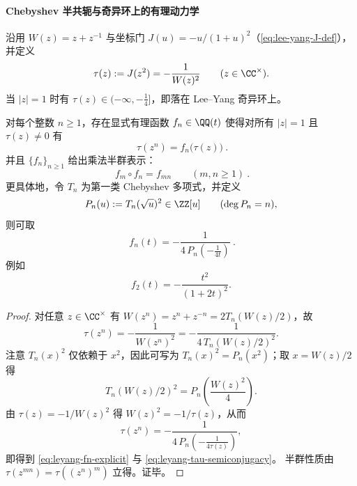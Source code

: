 \paragraph{Chebyshev 半共轭与奇异环上的有理动力学}
沿用 \(W(z)=z+z^{-1}\) 与坐标门 \(J(u)=-u/(1+u)^2\)（\eqref{eq:lee-yang-J-def}），并定义
\begin{equation}\label{eq:leyang-tau-def}
\tau(z):=J(z^2)=-\frac{1}{W(z)^2}\qquad(z\in\CC^{\times}).
\end{equation}
当 \(|z|=1\) 时有 \(\tau(z)\in(-\infty,-\tfrac14]\)，即落在 Lee--Yang 奇异环上。

\begin{theorem}\label{thm:leyang-chebyshev-semiconjugacy}
对每个整数 \(n\ge 1\)，存在显式有理函数 \(f_n\in\QQ(t)\) 使得对所有 \(|z|=1\) 且 \(\tau(z)\neq 0\) 有
\begin{equation}\label{eq:leyang-tau-semiconjugacy}
\boxed{\ \tau(z^n)=f_n\bigl(\tau(z)\bigr)\ }.
\end{equation}
并且 \(\{f_n\}_{n\ge 1}\) 给出乘法半群表示：
\begin{equation}\label{eq:leyang-tau-semigroup}
\boxed{\ f_m\circ f_n=f_{mn}\qquad(m,n\ge 1)\ }.
\end{equation}
更具体地，令 \(T_n\) 为第一类 Chebyshev 多项式，并定义
\[
P_n(u):=T_n(\sqrt{u})^2\in\ZZ[u]\qquad(\deg P_n=n),
\]
则可取
\begin{equation}\label{eq:leyang-fn-explicit}
\boxed{\ f_n(t)=-\frac{1}{4\,P_n\!\left(-\frac{1}{4t}\right)}\ }.
\end{equation}
例如
\[
f_2(t)=-\frac{t^2}{(1+2t)^2}.
\]
\end{theorem}

\begin{proof}
对任意 \(z\in\CC^{\times}\) 有
\(
W(z^n)=z^n+z^{-n}=2T_n(W(z)/2)
\)，故
\[
\tau(z^n)=-\frac{1}{W(z^n)^2}
=-\frac{1}{4\,T_n(W(z)/2)^2}.
\]
注意 \(T_n(x)^2\) 仅依赖于 \(x^2\)，因此可写为 \(T_n(x)^2=P_n(x^2)\)；取 \(x=W(z)/2\) 得
\[
T_n(W(z)/2)^2=P_n\!\left(\frac{W(z)^2}{4}\right).
\]
由 \(\tau(z)=-1/W(z)^2\) 得 \(W(z)^2=-1/\tau(z)\)，从而
\[
\tau(z^n)
=-\frac{1}{4\,P_n\!\left(-\frac{1}{4\tau(z)}\right)},
\]
即得到 \eqref{eq:leyang-fn-explicit} 与 \eqref{eq:leyang-tau-semiconjugacy}。
半群性质由 \(\tau(z^{mn})=\tau((z^n)^m)\) 立得。证毕。
\end{proof}

